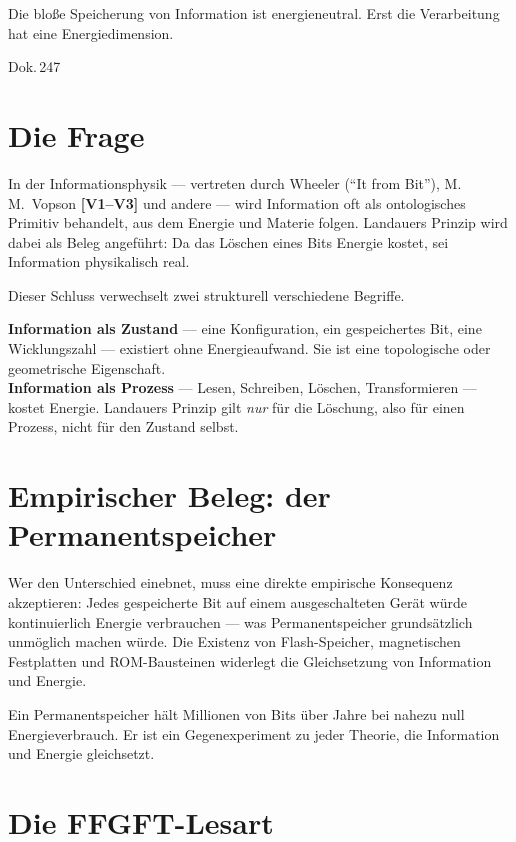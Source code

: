 \label{ch:zustand_prozess}

\epigraph{Die bloße Speicherung von Information ist energieneutral.
Erst die Verarbeitung hat eine Energiedimension.}{Dok.\,247}

\section{Die Frage}

In der Informationsphysik --- vertreten durch Wheeler (``It from Bit''),
M.\,M.~Vopson \textbf{[V1--V3]} und andere --- wird Information oft als ontologisches Primitiv
behandelt, aus dem Energie und Materie folgen. Landauers Prinzip wird dabei
als Beleg angeführt: Da das Löschen eines Bits Energie kostet,
sei Information physikalisch real.

Dieser Schluss verwechselt zwei strukturell verschiedene Begriffe.

\begin{keyresult}
\textbf{Information als Zustand} --- eine Konfiguration, ein gespeichertes Bit,
eine Wicklungszahl --- existiert ohne Energieaufwand. Sie ist eine topologische
oder geometrische Eigenschaft.\\[4pt]
\textbf{Information als Prozess} --- Lesen, Schreiben, Löschen, Transformieren
--- kostet Energie. Landauers Prinzip gilt \emph{nur} für die Löschung, also
für einen Prozess, nicht für den Zustand selbst.
\end{keyresult}

\section{Empirischer Beleg: der Permanentspeicher}

Wer den Unterschied einebnet, muss eine direkte empirische Konsequenz
akzeptieren: Jedes gespeicherte Bit auf einem ausgeschalteten Gerät würde
kontinuierlich Energie verbrauchen --- was Permanentspeicher grundsätzlich
unmöglich machen würde. Die Existenz von Flash-Speicher, magnetischen Festplatten
und ROM-Bausteinen widerlegt die Gleichsetzung von Information und Energie.

Ein Permanentspeicher hält Millionen von Bits über Jahre bei nahezu null
Energieverbrauch. Er ist ein Gegenexperiment zu jeder Theorie, die Information
und Energie gleichsetzt.

\section{Die FFGFT-Lesart}

